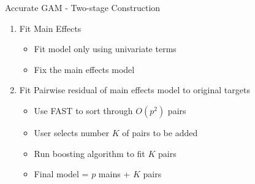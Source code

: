 \documentclass[11pt,compress,t,notes=noshow, aspectratio=169, xcolor=table]{beamer}
\begin{document}
\begin{frame}{Accurate GAM - Two-stage Construction}
\begin{enumerate}
    \item Fit Main Effects
    \begin{itemize}
        \item Fit model only using univariate terms
        \item Fix the main effects model
    \end{itemize}
    \item Fit Pairwise residual of main effects model to original targets
    \begin{itemize}
        \item Use FAST to sort through $O(p^2)$ pairs
        \item User selects number $K$ of pairs to be added
        \item Run boosting algorithm to fit $K$ pairs
        \item Final model = $p$ mains + $K$ pairs
    \end{itemize}
\end{enumerate}
\end{frame}
\end{document}
